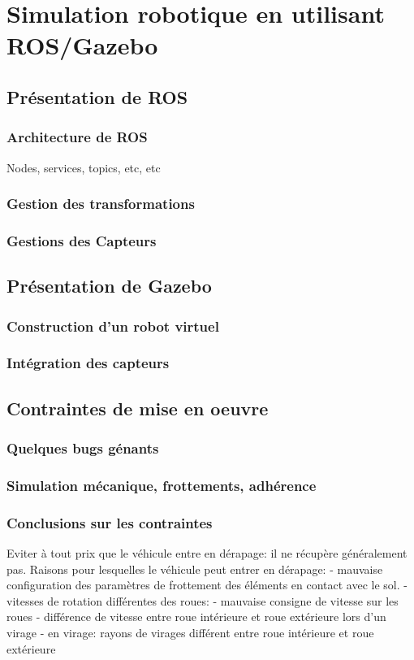 \documentclass[12pt,a4paper]{report}
\begin{document}
\chapter{Simulation robotique en utilisant ROS/Gazebo}
	\section{Présentation de ROS}
		\subsection{Architecture de ROS}
			Nodes, services, topics, etc, etc
		\subsection{Gestion des transformations}
		\subsection{Gestions des Capteurs}
	\section{Présentation de Gazebo}
		\subsection{Construction d'un robot virtuel}
		\subsection{Intégration des capteurs}
		
	\section{Contraintes de mise en oeuvre}
		\subsection{Quelques bugs génants}
		\subsection{Simulation mécanique, frottements, adhérence}
		\subsection{Conclusions sur les contraintes}
		Eviter à tout prix que le véhicule entre en dérapage: il ne récupère généralement pas.
		Raisons pour lesquelles le véhicule peut entrer en dérapage:
			- mauvaise configuration des paramètres de frottement des éléments en contact avec le sol.
			- vitesses de rotation différentes des roues: 
				- mauvaise consigne de vitesse sur les roues
				- différence de vitesse entre roue intérieure et roue extérieure lors d'un virage
			- en virage: rayons de virages différent entre roue intérieure et roue extérieure
			
\end{document}
